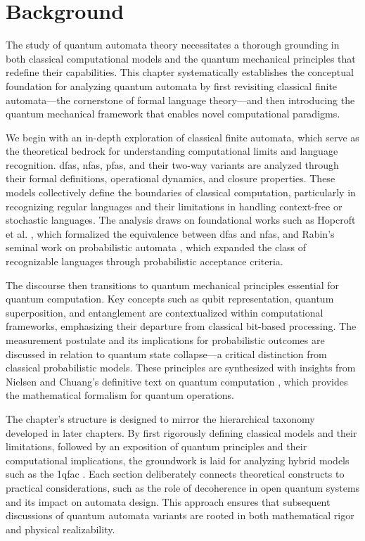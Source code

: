 \chapter{Background}  

The study of quantum automata theory necessitates a thorough grounding in both classical computational models and the quantum mechanical principles that redefine their capabilities. This chapter systematically establishes the conceptual foundation for analyzing quantum automata by first revisiting classical finite automata—the cornerstone of formal language theory—and then introducing the quantum mechanical framework that enables novel computational paradigms.

We begin with an in-depth exploration of classical finite automata, which serve as the theoretical bedrock for understanding computational limits and language recognition. \glspl{dfa}, \glspl{nfa}, \glspl{pfa}, and their two-way variants are analyzed through their formal definitions, operational dynamics, and closure properties. These models collectively define the boundaries of classical computation, particularly in recognizing regular languages and their limitations in handling context-free or stochastic languages. The analysis draws on foundational works such as Hopcroft et al. \cite{hopcroft2006introduction}, which formalized the equivalence between \glspl{dfa} and \glspl{nfa}, and Rabin's seminal work on probabilistic automata \cite{rabin1963probabilistic}, which expanded the class of recognizable languages through probabilistic acceptance criteria.

The discourse then transitions to quantum mechanical principles essential for quantum computation. Key concepts such as qubit representation, quantum superposition, and entanglement are contextualized within computational frameworks, emphasizing their departure from classical bit-based processing. The measurement postulate and its implications for probabilistic outcomes are discussed in relation to quantum state collapse—a critical distinction from classical probabilistic models. These principles are synthesized with insights from Nielsen and Chuang's definitive text on quantum computation \cite{nielsen2010quantum}, which provides the mathematical formalism for quantum operations.

The chapter's structure is designed to mirror the hierarchical taxonomy developed in later chapters. By first rigorously defining classical models and their limitations, followed by an exposition of quantum principles and their computational implications, the groundwork is laid for analyzing hybrid models such as the \gls{1qfac} \cite{zheng2012one}. Each section deliberately connects theoretical constructs to practical considerations, such as the role of decoherence in open quantum systems \cite{breuer2002theory} and its impact on automata design. This approach ensures that subsequent discussions of quantum automata variants are rooted in both mathematical rigor and physical realizability.



